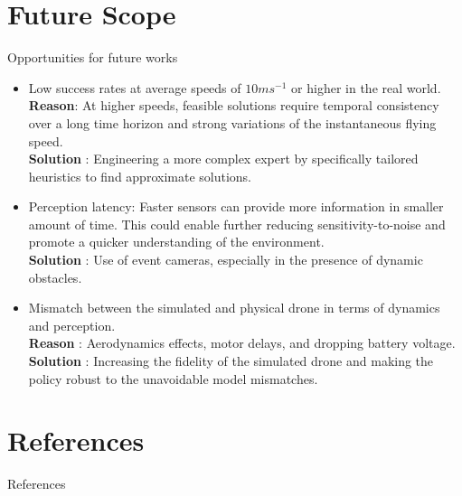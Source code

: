 \documentclass{beamer}
\begin{document}
\section{Future Scope}
\begin{frame}[allowframebreaks]{Opportunities for future works}
	\begin{itemize}
		\item Low success rates at average speeds of $10 ms^{-1}$ or higher in the real world. \\
		\textbf{Reason}: At higher speeds, feasible solutions require temporal consistency over a long time horizon and strong variations of the instantaneous flying speed.\\
		\textbf{Solution} : Engineering a more complex expert by specifically tailored heuristics to find approximate solutions. 
		
		\item Perception latency: Faster sensors can provide more information in smaller amount of time. This could enable further reducing sensitivity-to-noise and promote a quicker understanding of the environment. \\
		\textbf{Solution} : Use of event cameras, especially in the presence of dynamic obstacles.
		
		\item Mismatch between the simulated and physical drone in terms of dynamics and perception. \\
		\textbf{Reason} : Aerodynamics effects, motor delays, and dropping battery voltage. \\
		\textbf{Solution} : Increasing the fidelity of the simulated drone and making the policy robust to the unavoidable model mismatches.		
	\end{itemize}
	
\end{frame}

\section{References}
\begin{frame}[allowframebreaks]{References}
	\printbibliography
\end{frame}
\end{document}
